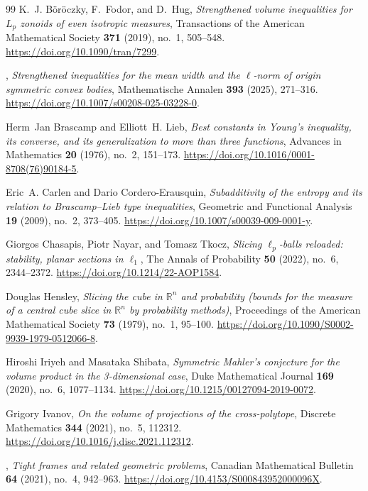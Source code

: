 \documentclass[11pt,a4paper]{article}
\theoremstyle{remark}\newtheorem{remark}[theorem]{Remark}
\numberwithin{equation}{section}
\begin{document}
\begin{thebibliography}{99}
K.~J. B\"or\"oczky, F.~Fodor, and D.~Hug, \emph{Strengthened volume
inequalities for \(L_p\) zonoids of even isotropic measures},
Transactions of the American Mathematical Society \textbf{371}
(2019), no.~1, 505--548.
\newblock \url{https://doi.org/10.1090/tran/7299}.

\bysame, \emph{Strengthened inequalities for the mean width and the $\ell$-norm of origin symmetric convex bodies},
Mathematische Annalen \textbf{393} (2025), 271--316.
\newblock \url{https://doi.org/10.1007/s00208-025-03228-0}.

Herm~Jan Brascamp and Elliott~H. Lieb, \emph{Best constants in {Young}'s
  inequality, its converse, and its generalization to more than three
  functions}, Advances in Mathematics \textbf{20} (1976), no.~2, 151--173.
\newblock \url{https://doi.org/10.1016/0001-8708(76)90184-5}.

Eric~A. Carlen and Dario Cordero-Erausquin, \emph{Subadditivity of the entropy
  and its relation to {Brascamp--Lieb} type inequalities}, Geometric and
  Functional Analysis \textbf{19} (2009), no.~2, 373--405.
\newblock \url{https://doi.org/10.1007/s00039-009-0001-y}.

Giorgos Chasapis, Piotr Nayar, and Tomasz Tkocz, \emph{Slicing {$\ell_p$}-balls
  reloaded: stability, planar sections in {$\ell_1$}}, The Annals of
  Probability \textbf{50} (2022), no.~6, 2344--2372.
\newblock \url{https://doi.org/10.1214/22-AOP1584}.

Douglas Hensley, \emph{Slicing the cube in $\mathbb R^n$ and probability
  (bounds for the measure of a central cube slice in $\mathbb R^n$ by
  probability methods)}, Proceedings of the American Mathematical Society
  \textbf{73} (1979), no.~1, 95--100.
\newblock \url{https://doi.org/10.1090/S0002-9939-1979-0512066-8}.

Hiroshi Iriyeh and Masataka Shibata, \emph{Symmetric Mahler's conjecture for the volume product in the 3-dimensional case},
Duke Mathematical Journal \textbf{169} (2020), no.~6, 1077--1134.
\newblock \url{https://doi.org/10.1215/00127094-2019-0072}.

Grigory Ivanov, \emph{On the volume of projections of the cross-polytope},
  Discrete Mathematics \textbf{344} (2021), no.~5, 112312.
\newblock \url{https://doi.org/10.1016/j.disc.2021.112312}.

\bysame, \emph{Tight frames and related geometric problems}, Canadian
  Mathematical Bulletin \textbf{64} (2021), no.~4, 942--963.
\newblock \url{https://doi.org/10.4153/S000843952000096X}.


\end{thebibliography}
\end{document}
